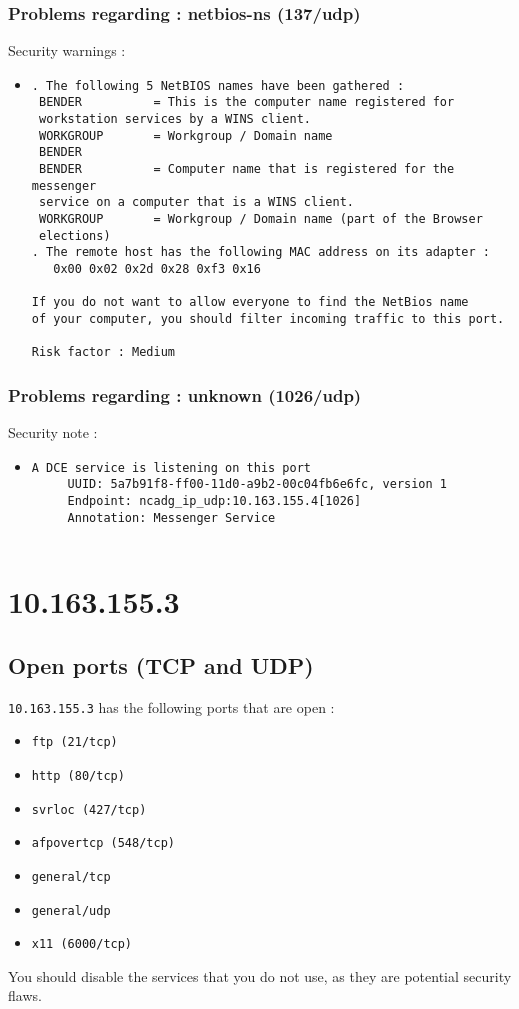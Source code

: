 \documentclass{article}
\begin{document}
\subsubsection{Problems regarding : netbios-ns (137/udp)}
Security warnings :\\
\begin{itemize}
\item \begin{verbatim}
. The following 5 NetBIOS names have been gathered :
 BENDER          = This is the computer name registered for
 workstation services by a WINS client.
 WORKGROUP       = Workgroup / Domain name
 BENDER         
 BENDER          = Computer name that is registered for the messenger
 service on a computer that is a WINS client.
 WORKGROUP       = Workgroup / Domain name (part of the Browser
 elections)
. The remote host has the following MAC address on its adapter :
   0x00 0x02 0x2d 0x28 0xf3 0x16 

If you do not want to allow everyone to find the NetBios name
of your computer, you should filter incoming traffic to this port.

Risk factor : Medium
\end{verbatim}\end{itemize}
\subsubsection{Problems regarding : unknown (1026/udp)}
Security note :\\
\begin{itemize}
\item \begin{verbatim}
A DCE service is listening on this port
     UUID: 5a7b91f8-ff00-11d0-a9b2-00c04fb6e6fc, version 1
     Endpoint: ncadg_ip_udp:10.163.155.4[1026]
     Annotation: Messenger Service


\end{verbatim}\end{itemize}
\newpage
\section{10.163.155.3}
\subsection{Open ports (TCP and UDP)}
\verb+10.163.155.3+ has the following ports that are open : 
\begin{itemize}
\item\verb+ftp (21/tcp)+
\item\verb+http (80/tcp)+
\item\verb+svrloc (427/tcp)+
\item\verb+afpovertcp (548/tcp)+
\item\verb+general/tcp+
\item\verb+general/udp+
\item\verb+x11 (6000/tcp)+
\end{itemize}
You should disable the services that you do not use, as they are potential security flaws.
\end{document}

